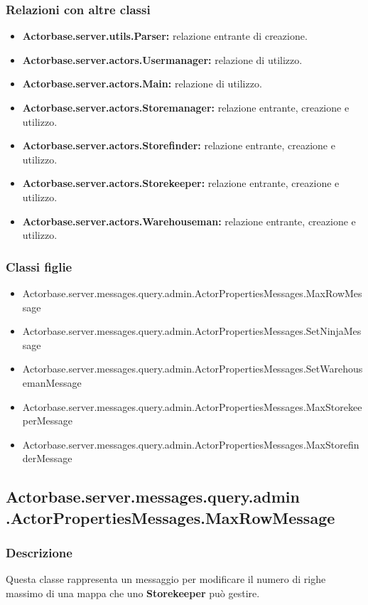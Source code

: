 \documentclass[a4paper]{article}
\begin{document}
			\subsubsection{Relazioni con altre classi}
				\begin{itemize}
					\item \textbf{Actorbase.server.utils.Parser:} relazione entrante di creazione.
					\item \textbf{Actorbase.server.actors.Usermanager:} relazione di utilizzo.
					\item \textbf{Actorbase.server.actors.Main:} relazione di utilizzo.
					\item \textbf{Actorbase.server.actors.Storemanager:} relazione entrante, creazione e utilizzo.
					\item \textbf{Actorbase.server.actors.Storefinder:} relazione entrante, creazione e utilizzo.
					\item \textbf{Actorbase.server.actors.Storekeeper:} relazione entrante, creazione e utilizzo.
					\item \textbf{Actorbase.server.actors.Warehouseman:} relazione entrante, creazione e utilizzo.
				\end{itemize}
			\subsubsection{Classi figlie}
				\begin{itemize}
					\item Actorbase.server.messages.query.admin.ActorPropertiesMessages.MaxRowMessage
					\item Actorbase.server.messages.query.admin.ActorPropertiesMessages.SetNinjaMessage
					\item Actorbase.server.messages.query.admin.ActorPropertiesMessages.SetWarehousemanMessage
					\item Actorbase.server.messages.query.admin.ActorPropertiesMessages.MaxStorekeeperMessage
					\item Actorbase.server.messages.query.admin.ActorPropertiesMessages.MaxStorefinderMessage
				\end{itemize}

		\subsection{Actorbase.server.messages.query.admin \newline
		.ActorPropertiesMessages.MaxRowMessage}
		
			\subsubsection{Descrizione}
				Questa classe rappresenta un messaggio per modificare il numero di righe massimo di una mappa che uno \textbf{Storekeeper} può gestire.
				
\end{document}
